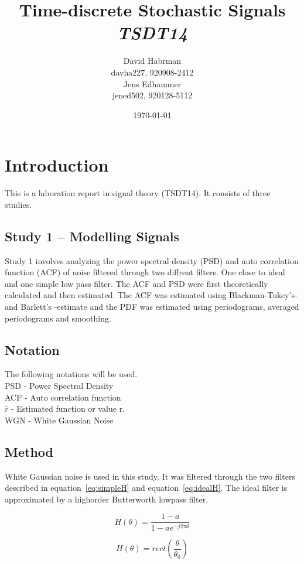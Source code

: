 \documentclass[10pt]{article}
\title{Time-discrete Stochastic Signals\\
\emph{TSDT14}}
\author{David Habrman \\ davha227, 920908-2412\\
Jens Edhammer \\ jened502, 920128-5112 }
\date{\today}
\begin{document}
\maketitle

\section{Introduction}
This is a laboration report in signal theory (TSDT14). It consists of three studies.

\subsection{Study 1 – Modelling Signals}
Study 1 involves analyzing the power spectral density (PSD) and auto correlation function (ACF)
of noise filtered through two diffrent filters. One close to ideal and one simple low pass filter.
The ACF and PSD were first theoretically calculated and then estimated.
The ACF was estimated using Blackman-Tukey's- and Barlett's -estimate and the
PDF was estimated using periodograms, averaged periodograms and smoothing.

\subsection{Notation}
The following notations will be used. \\
PSD - Power Spectral Density \\
ACF - Auto correlation function \\
$\hat{r}$ - Estimated function or value r. \\
WGN - White Gaussian Noise

\subsection{Method}

White Gaussian noise is used in this study. It was filtered through the two
 filters described in equation~\ref{eq:simpleH} and equation~\ref{eq:idealH}.
 The ideal filter is approximated by a highorder Butterworth lowpass filter.

\begin{equation}
  \label{eq:simpleH}
  H(\theta) =\frac{1-a}{1-ae^{-j2\pi\theta }}
\end{equation}

\begin{equation}
  \label{eq:idealH}
  H(\theta) =rect(\frac{\theta}{\theta_0} )
\end{equation}
\end{document}
